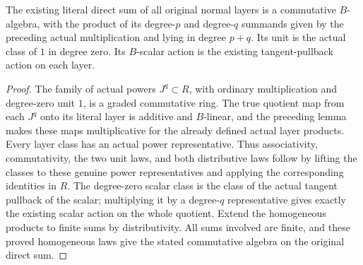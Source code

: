 \begin{theorem}
\label{hir:relative-normal-intrinsic-graded-algebra}
\leanok
{}
The existing literal direct sum of all original normal layers is a
commutative $B$-algebra, with the product of its degree-$p$ and
degree-$q$ summands given by the preceding actual multiplication and lying
in degree $p+q$. Its unit is the actual class of $1$ in degree zero.
Its $B$-scalar action is the existing tangent-pullback action on each layer.
\end{theorem}
\begin{proof}
The family of actual powers $J^q\subset R$, with ordinary multiplication
and degree-zero unit $1$, is a graded commutative ring. The true quotient
map from each $J^q$ onto its literal layer is additive and $B$-linear,
and the preceding lemma makes these maps multiplicative for the already
defined actual layer products. Every layer class has an actual power
representative. Thus associativity, commutativity, the two unit laws, and
both distributive laws follow by lifting the classes to these genuine
power representatives and applying the corresponding identities in $R$.
The degree-zero scalar class is the class of the actual tangent pullback of
the scalar; multiplying it by a degree-$q$ representative gives exactly
the existing scalar action on the whole quotient. Extend the homogeneous
products to finite sums by distributivity. All sums involved are finite,
and these proved homogeneous laws give the stated commutative algebra on
the original direct sum.
\end{proof}

